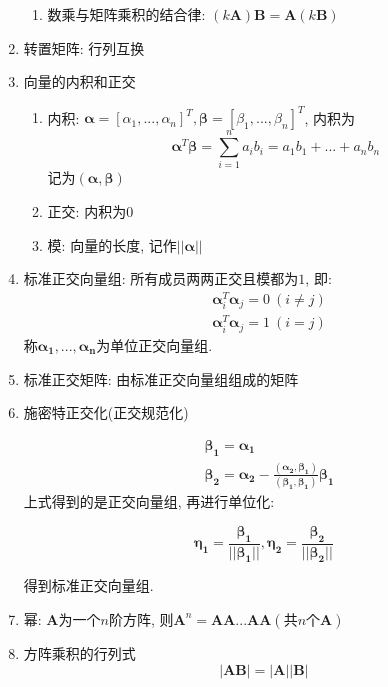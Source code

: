 \begin{enumerate}
\begin{enumerate}
\item 数乘与矩阵乘积的结合律: $ (k\bm{A})\bm{B}=\bm{A}(k\bm{B}) $
\end{enumerate}
\item 转置矩阵: 行列互换
\item 向量的内积和正交
\begin{enumerate}
\item 内积: $ \bm{\alpha} = [\alpha_{1},...,\alpha_{n}]^{T}, \bm{\beta} = [\beta_{1},...,\beta_{n}]^{T} $, 内积为
\begin{equation*}
\bm{\alpha}^{T}\bm{\beta}=\sum_{i=1}^{n}a_{i}b_{i}=a_{1}b_{1}+...+a_{n}b_{n}
\end{equation*}
记为$ (\bm{\alpha},\bm{\beta}) $
\item 正交: 内积为$ 0 $
\item 模: 向量的长度, 记作$ ||\bm{\alpha}|| $
\end{enumerate}
\item 标准正交向量组: 所有成员两两正交且模都为$ 1 $, 即:
\begin{equation*}
\begin{aligned}
&\bm{\alpha}_{i}^{T}\bm{\alpha}_{j}=0\ (i\neq j)\\&\bm{\alpha}_{i}^{T}\bm{\alpha}_{j}=1\ (i=j)
\end{aligned}
\end{equation*}
称$ \bm{\alpha_{1}},...,\bm{\alpha_{n}} $为单位正交向量组.
\item 标准正交矩阵: 由标准正交向量组组成的矩阵
\item 施密特正交化(正交规范化)\par
\begin{equation*}
\begin{aligned}
&\bm{\beta_{1}}=\bm{\alpha_{1}}\\&\bm{\beta_{2}}=\bm{\alpha_{2}}-\frac{(\bm{\alpha_{2}},\bm{\beta_{1}})}{(\bm{\beta_{1}},\bm{\beta_{1}})}\bm{\beta_{1}}
\end{aligned}
\end{equation*}
上式得到的是正交向量组, 再进行单位化:\par
\begin{equation*}
\bm{\eta_{1}}=\frac{\bm{\beta_{1}}}{||\bm{\beta_{1}}||}, \bm{\eta_{2}}=\frac{\bm{\beta_{2}}}{||\bm{\beta_{2}}||}
\end{equation*}\par
得到标准正交向量组.
\item 幂: $ \bm{A} $为一个$ n $阶方阵, 则$ \bm{A}^{n}=\bm{A}\bm{A}...\bm{A}\bm{A}(\text{共}n\text{个}\bm{A}) $
\item 方阵乘积的行列式
\begin{equation*}
|\bm{A}\bm{B}|=|\bm{A}||\bm{B}|
\end{equation*}
\end{enumerate}
